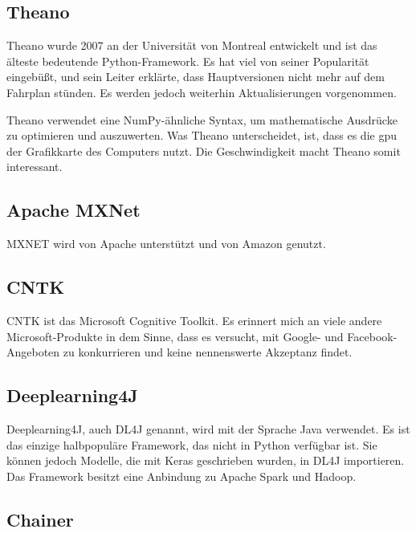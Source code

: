 \subsection{Theano}

Theano wurde 2007 an der Universität von Montreal entwickelt und ist das älteste bedeutende Python-Framework. Es hat viel von seiner Popularität eingebüßt, und sein Leiter erklärte, dass Hauptversionen nicht mehr auf dem Fahrplan stünden. Es werden jedoch weiterhin Aktualisierungen vorgenommen. \cite{Theano:2016}

Theano verwendet eine NumPy-ähnliche Syntax, um mathematische Ausdrücke zu optimieren und auszuwerten. Was Theano unterscheidet, ist, dass es die \ac{gpu} der Grafikkarte des Computers nutzt.
 Die Geschwindigkeit macht Theano somit interessant.

\subsection{Apache MXNet}

MXNET wird von Apache unterstützt und von Amazon genutzt. \cite{MXNet:2020}

\subsection{CNTK}

CNTK ist das Microsoft Cognitive Toolkit. Es erinnert mich an viele andere Microsoft-Produkte in dem Sinne, dass es versucht, mit Google- und Facebook-Angeboten zu konkurrieren und keine nennenswerte Akzeptanz findet. \cite{CNTK:2020}

\subsection{Deeplearning4J}


Deeplearning4J, auch DL4J genannt, wird mit der Sprache Java verwendet. Es ist das einzige halbpopuläre Framework, das nicht in Python verfügbar ist. Sie können jedoch Modelle, die mit Keras geschrieben wurden, in DL4J importieren. Das Framework besitzt eine Anbindung zu Apache Spark und Hadoop. \cite{Deeplearning4J:2020}


\subsection{Chainer}

